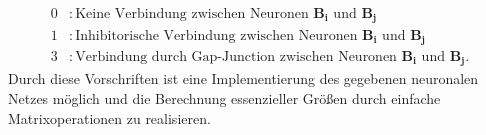 	\begin{align*}
		0 &: \text{Keine Verbindung zwischen Neuronen }\boldsymbol{B_i}\text{ und } \boldsymbol{B_j}\\
		1 &: \text{Inhibitorische Verbindung zwischen Neuronen }\boldsymbol{B_i}\text{ und }\boldsymbol{B_j}\\
		3 &: \text{Verbindung durch Gap-Junction zwischen Neuronen }\boldsymbol{B_i}\text{ und }\boldsymbol{B_j}.
	\end{align*}
	Durch diese Vorschriften ist eine Implementierung des gegebenen neuronalen Netzes möglich und die Berechnung essenzieller Größen durch einfache Matrixoperationen zu realisieren.

